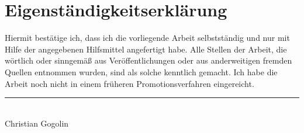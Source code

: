 \documentclass[a4paper,12pt,listof=totoc,index=totoc,bibliography=totoc,headsepline=false,headings=normal,BCOR16.153846mm,DIV12,headinclude,twoside,cleardoublepage=empty,numbers=noenddot,final]{scrreprt}
\theoremstyle{mystyle}
\numberwithin{equation}{section}
\numberwithin{figure}{section}
\numberwithin{lemma}{section}
\numberwithin{theorem}{section}
\numberwithin{corollary}{section}
\numberwithin{definition}{section}
\numberwithin{conjecture}{section}
\numberwithin{observation}{section}
\newcommand{\+}{\mkern2mu}
\DeclareMathOperator{\1}{\mathds{1}}
\begin{document}


\cleardoublepage

\section{Eigenständigkeitserklärung}
%
Hiermit bestätige ich, dass ich die vorliegende Arbeit selbstständig und nur mit Hilfe der angegebenen Hilfsmittel angefertigt habe.
Alle Stellen der Arbeit, die wörtlich oder sinngemäß aus Veröffentlichungen oder aus anderweitigen fremden Quellen entnommen wurden, sind als solche kenntlich gemacht.
Ich habe die Arbeit noch nicht in einem früheren Promotionsverfahren eingereicht.

{\begin{flushright}\rule{60mm}{0.2pt}\\{\footnotesize Christian Gogolin} \end{flushright}}
\cleardoublepage

\end{document}
